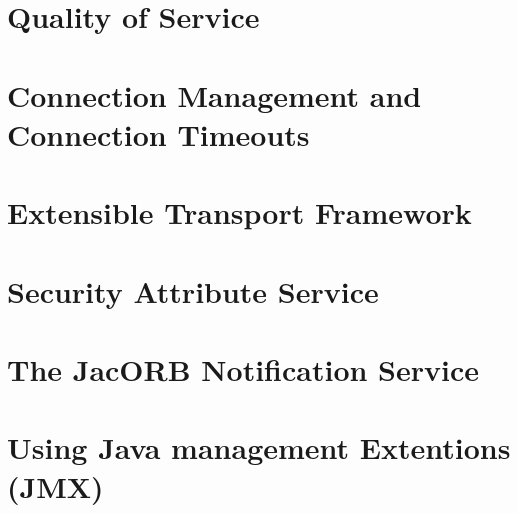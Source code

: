 \documentclass[12pt]{scrbook}
\begin{document}
\chapter{Quality of Service}
\label{ch:qos}




\chapter{Connection Management and Connection Timeouts}
\label{ch:connections}




\chapter{Extensible Transport Framework}
\label{ch:etf}




\chapter{Security Attribute Service}
\label{ch:sas}




\chapter{The JacORB Notification Service}
\label{ch:ntfy}




\chapter{Using Java management Extentions (JMX)}
\label{ch:jmx}




\end{document}
